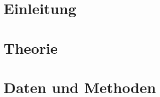 \documentclass[openany]{scrbook}
\begin{document}

  


\tableofcontents
	
\chapter{Einleitung}
\Blindtext	

\chapter{Theorie}
\Blindtext	

\chapter{Daten und Methoden}
\Blindtext	


	
\end{document}
